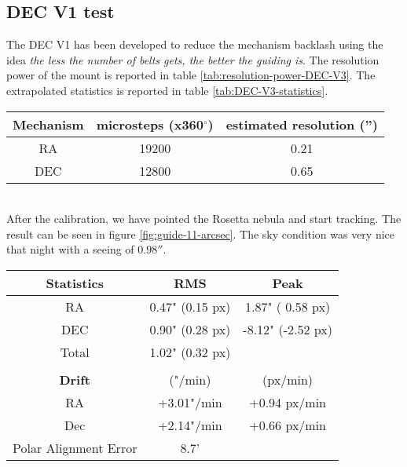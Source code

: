 \subsection{DEC V1 test}
The DEC V1 has been developed to reduce the mechanism backlash using the idea \textit{the less the number of belts gets, the better the guiding is}.
The resolution power of the mount is reported in table \ref{tab:resolution-power-DEC-V3}.
The extrapolated statistics is reported in table \ref{tab:DEC-V3-statistics}.
\\
\begin{minipage}
    {.5\textwidth}
    \begin{tabular}{ccc}
        \textbf{Mechanism} & \textbf{microsteps (x360$^{\circ}$)} &\textbf{estimated resolution ('')}\\
        \hline
        RA  & 19200 & 0.21\\ 
        DEC & 12800 & 0.65
    \end{tabular}
    \label{tab:resolution-power-DEC-V3}
\end{minipage}
\\
After the calibration, we have pointed the Rosetta nebula and start tracking.
The result can be seen in figure \ref{fig:guide-11-arcsec}.
The sky condition was very nice that night with a seeing of \(0.98''\).
\\
\begin{minipage}{.4\textwidth}
    \centering
    \begin{tabular}{ccc}
        \textbf{Statistics}&RMS&Peak\\
        \hline
        RA& 0.47" (0.15 px)& 1.87" ( 0.58 px)\\
        DEC& 0.90" (0.28 px)&-8.12" (-2.52 px)\\
        Total& 1.02" (0.32 px)&\\
        \\
        \textbf{Drift}& ("/min) & (px/min)\\
        \hline
        RA& +3.01"/min& +0.94 px/min\\
        Dec& +2.14"/min& +0.66 px/min\\
        Polar Alignment Error& 8.7'&\\
        \hline
    \end{tabular}
    \label{tab:DEC-V3-statistics}
\end{minipage}

